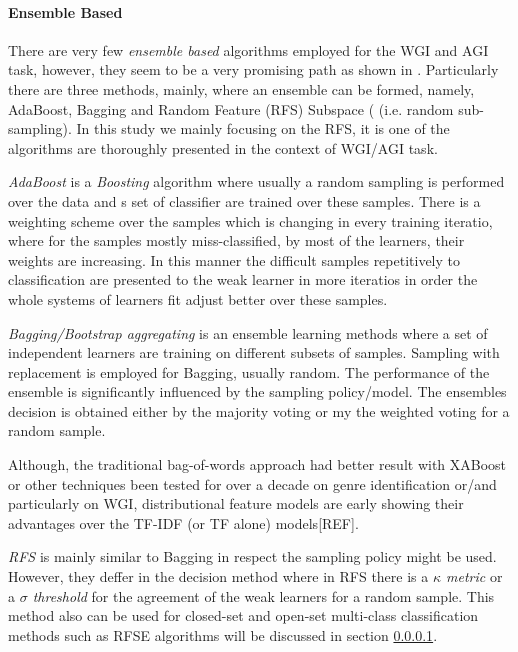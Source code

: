 \paragraph{Ensemble Based} There are very few \textit{ensemble based} algorithms employed for the WGI and AGI task, however, they seem to be a very promising path as shown in \parencite{onan2018ensemble,pritsos2015clef,pritsos2013open,pritsos2018open}. Particularly there are three methods, mainly, where an ensemble can be formed, namely, AdaBoost, Bagging and Random Feature (RFS) Subspace ( (i.e. random sub-sampling). In this study we mainly focusing on the RFS, it is one of the algorithms are thoroughly presented in the context of WGI/AGI task.

\textit{AdaBoost} is a \textit{Boosting} algorithm where usually a random sampling is performed over the data and s set of classifier are trained over these samples. There is a weighting scheme over the samples which is changing in every training iteratio, where for the samples mostly miss-classified, by most of the learners, their weights are increasing. In this manner the difficult samples repetitively to classification are presented to the weak learner in more iteratios in order the whole systems of learners fit adjust better over these samples.

\textit{Bagging/Bootstrap aggregating} is an ensemble learning methods where a set of independent learners are training on different subsets of samples. Sampling with replacement is employed for Bagging, usually random. The performance of the ensemble is significantly influenced by the sampling policy/model. The ensembles decision is obtained either by the majority voting or my the weighted voting for a random sample.

Although, the traditional bag-of-words approach had better result with XABoost or other techniques been tested for over a decade on genre identification or/and particularly on WGI, distributional feature models are early showing their advantages over the TF-IDF (or TF alone) models[REF].

\textit{RFS } is mainly similar to Bagging in respect the sampling policy might be used. However, they deffer in the decision method where in RFS there is a \textit{$\kappa$ metric} or a \textit{$\sigma$ threshold} for the agreement of the weak learners for a random sample. This method also can be used for closed-set and open-set multi-class classification methods such as RFSE algorithms will be discussed in section \ref{}.


